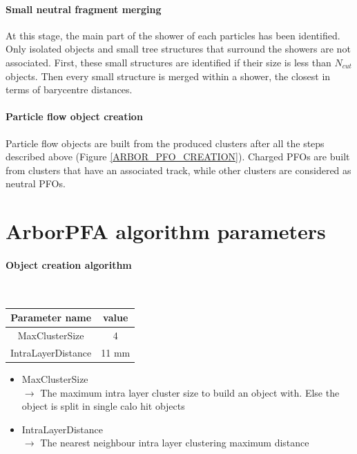 \documentclass[cits]{JINST}
\begin{document}
\paragraph*{Small neutral fragment merging} At this stage, the main part of the shower of each particles has been identified. Only isolated objects and small tree structures that surround the showers are not associated. First, these small structures are identified if their size is less than $N_{cut}$ objects. Then every small structure is merged within a shower, the closest in terms of barycentre distances.

\paragraph*{Particle flow object creation} Particle flow objects are built from the produced clusters after all the steps described above (Figure \ref{ARBOR_PFO_CREATION}). Charged PFOs are built from clusters that have an associated track, while other clusters are considered as neutral PFOs.

\newpage
\section{ArborPFA algorithm parameters}
\label{ARBOR_ALGORITHM_PARAMETERS}

\paragraph{Object creation algorithm} ~

\begin{table}[!h]
  \begin{center}
    \begin{tabu} to \linewidth { c | c } 
          Parameter name & value \\
          \hline
          MaxClusterSize & 4 \\
          IntraLayerDistance & 11 mm
    \end{tabu} 
  \end{center}
\end{table}

\begin{itemize}
 \item MaxClusterSize \\
 $\rightarrow$ The maximum intra layer cluster size to build an object with. Else the object is split in single calo hit objects
 \item IntraLayerDistance \\
 $\rightarrow$ The nearest neighbour intra layer clustering maximum distance
\end{itemize}
\end{document}
